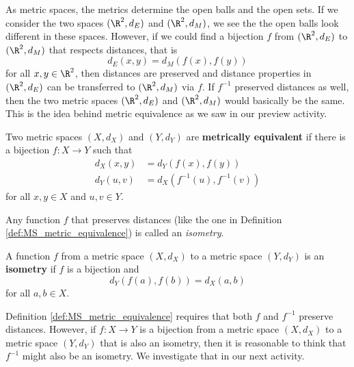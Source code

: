 \begin{comment}
	\ea


\item  We created an example in problem 3 with $X = ((0,1), d_E)$ and $Y = ((0,2), d_E)$, where $f : X \to Y$ defined by $f(x) = 2x$ provides the equivalence.  

\ee

\end{comment}

\label{sec_equiv_metric}

As metric spaces, the metrics determine the open balls and the open sets. If we consider the two spaces $(\R^2, d_E)$ and $(\R^2, d_M)$, we see the the open balls look different in these spaces. However, if we could find a bijection $f$ from $(\R^2, d_E)$ to $(\R^2, d_M)$ that respects distances, that is 
\[d_E(x,y) = d_M(f(x), f(y))\]
for all $x, y \in \R^2$, then distances are preserved and distance properties in $(\R^2, d_E)$ can be transferred to $(\R^2, d_M)$ via $f$. If $f^{-1}$ preserved distances as well, then the two metric spaces $(\R^2, d_E)$ and $(\R^2, d_M)$ would basically be the same. This is the idea behind metric equivalence as we saw in our preview activity.

\begin{definition} \label{def:MS_metric_equivalence} Two metric spaces $(X,d_X)$ and $(Y,d_Y)$ are \textbf{metrically equivalent} if there is a bijection $f : X \to Y$ such that 
\begin{align*}
d_X(x,y) &= d_Y(f(x),f(y)) \\
d_Y(u,v) &= d_X(f^{-1}(u), f^{-1}(v))
\end{align*}
for all $x,y \in X$ and $u,v \in Y$. 
\end{definition}

Any function $f$ that preserves distances (like the one in Definition \ref{def:MS_metric_equivalence}) is called an \emph{isometry}. 

\begin{definition} A function $f$ from a metric space $(X,d_X)$ to a metric space $(Y, d_Y)$ is an \textbf{isometry} if $f$ is a bijection and 
\begin{equation} \label{eq:distance_preserving} 
d_Y(f(a),f(b)) = d_X(a,b)
\end{equation}
for all $a, b \in X$. 
\end{definition}

Definition \ref{def:MS_metric_equivalence} requires that both $f$ and $f^{-1}$ preserve distances. However, if $f : X \to Y$  is a bijection from a metric space $(X,d_X)$ to a metric space $(Y,d_Y)$ that is also an isometry, then it is reasonable to think that $f^{-1}$ might also be an isometry. We investigate that in our next activity.

